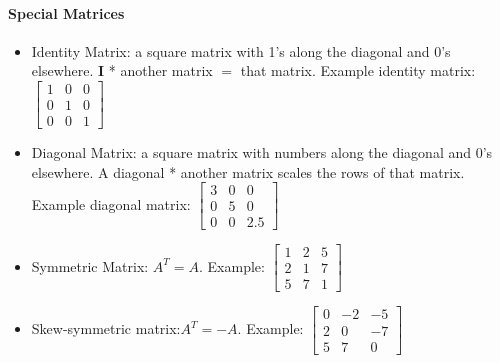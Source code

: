 \documentclass{article}
\begin{document}
\paragraph{Special Matrices}
\begin{itemize}
	\item Identity Matrix: a square matrix with 1's along the diagonal and 0's elsewhere. \textbf{I} * another matrix $=$ that matrix. Example identity matrix: $\begin{bmatrix}
    1 & 0 & 0 \\
    0 & 1 & 0 \\
    0 & 0 & 1
\end{bmatrix}$
    \item Diagonal Matrix: a square matrix with numbers along the diagonal and 0's elsewhere. A diagonal * another matrix scales the rows of that matrix. Example diagonal matrix: $\begin{bmatrix}
    3 & 0 & 0 \\
    0 & 5 & 0 \\
    0 & 0 & 2.5
\end{bmatrix}$
    \item Symmetric Matrix: $A^T = A$. Example: $\begin{bmatrix}
    1 & 2 & 5 \\
    2 & 1 & 7 \\
    5 & 7 & 1
\end{bmatrix}$
    \item Skew-symmetric matrix:$A^T = -A$. Example: $\begin{bmatrix}
    0 & -2 & -5 \\
    2 & 0 & -7 \\
    5 & 7 & 0
\end{bmatrix}$
\end{itemize}


\small


\end{document}
